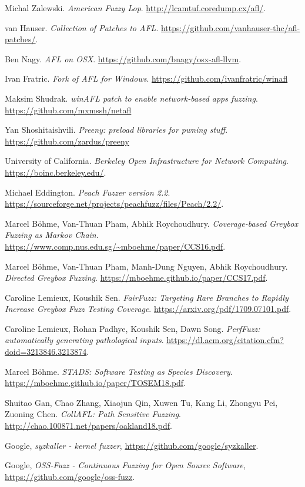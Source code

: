 \begin{thebibliography}{99} %

  Michal Zalewski. %
  \textit{American Fuzzy Lop}. %
  \url{http://lcamtuf.coredump.cx/afl/}. %

  van Hauser.
  \textit{Collection of Patches to AFL}.
  \url{https://github.com/vanhauser-thc/afl-patches/}.

  Ben Nagy.
  \textit{AFL on OSX}.
  \url{https://github.com/bnagy/osx-afl-llvm}.

  Ivan Fratric.
  \textit{Fork of AFL for Windows}.
  \url{https://github.com/ivanfratric/winafl}

  Maksim Shudrak.
  \textit{winAFL patch to enable network-based apps fuzzing}.
  \url{https://github.com/mxmssh/netafl}

  Yan Shoshitaishvili.
  \textit{Preeny: preload libraries for pwning stuff}.
  \url{https://github.com/zardus/preeny}

  University of California.
  \textit{Berkeley Open Infrastructure for Network Computing}.
  \url{https://boinc.berkeley.edu/}.

  Michael Eddington.
  \textit{Peach Fuzzer version 2.2}.
  \url{https://sourceforge.net/projects/peachfuzz/files/Peach/2.2/}.

  Marcel B\"ohme, Van-Thuan Pham, Abhik Roychoudhury.
  \textit{Coverage-based Greybox Fuzzing as Markov Chain}.
  \url{https://www.comp.nus.edu.sg/~mboehme/paper/CCS16.pdf}.

  Marcel B\"ohme, Van-Thuan Pham, Manh-Dung Nguyen, Abhik Roychoudhury.
  \textit{Directed Greybox Fuzzing}.
  \url{https://mboehme.github.io/paper/CCS17.pdf}.

  Caroline Lemieux, Koushik Sen.
  \textit{FairFuzz: Targeting Rare Branches to Rapidly Increase Greybox Fuzz Testing Coverage}.
  \url{https://arxiv.org/pdf/1709.07101.pdf}.

  Caroline Lemieux, Rohan Padhye, Koushik Sen, Dawn Song.
  \textit{PerfFuzz: automatically generating pathological inputs}.
  \url{https://dl.acm.org/citation.cfm?doid=3213846.3213874}.

  Marcel B\"ohme.
  \textit{STADS: Software Testing as Species Discovery}.
  \url{https://mboehme.github.io/paper/TOSEM18.pdf}.

  Shuitao Gan, Chao Zhang, Xiaojun Qin, Xuwen Tu, Kang Li, Zhongyu Pei, Zuoning Chen.
  \textit{CollAFL: Path Sensitive Fuzzing}.
  \url{http://chao.100871.net/papers/oakland18.pdf}.

  Google,
  \textit{syzkaller - kernel fuzzer},
  \url{https://github.com/google/syzkaller}.

  Google,
  \textit{OSS-Fuzz - Continuous Fuzzing for Open Source Software},
  \url{https://github.com/google/oss-fuzz}.


\end{thebibliography}
